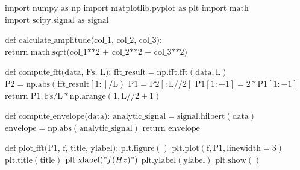 \begin{algorithmic}[1]
	\STATE $\text{import numpy as np}$
	\STATE $\text{import matplotlib.pyplot as plt}$
	\STATE $\text{import math}$
	\STATE $\text{import scipy.signal as signal}$
	
	\STATE
	\STATE $\text{def calculate\_amplitude(col\_1, col\_2, col\_3):}$
	\STATE \hspace{0.5cm} $\text{return math.sqrt(col\_1**2 + col\_2**2 + col\_3**2)}$
	
	\STATE
	\STATE $\text{def compute\_fft(data, Fs, L):}$
	\STATE \hspace{0.5cm} $\text{fft\_result} = \text{np.fft.fft}(\text{data}, \text{L})$
	\STATE \hspace{0.5cm} $\text{P2} = \text{np.abs}(\text{fft\_result}[1:] / \text{L})$
	\STATE \hspace{0.5cm} $\text{P1} = \text{P2}[: \text{L} // 2]$
	\STATE \hspace{0.5cm} $\text{P1}[1:-1] = 2 * \text{P1}[1:-1]$
	\STATE \hspace{0.5cm} $\text{return P1}, \text{Fs} / \text{L} * \text{np.arange}(1, \text{L} // 2 + 1)$
	
	\STATE
	\STATE $\text{def compute\_envelope(data):}$
	\STATE \hspace{0.5cm} $\text{analytic\_signal} = \text{signal.hilbert}(\text{data})$
	\STATE \hspace{0.5cm} $\text{envelope} = \text{np.abs}(\text{analytic\_signal})$
	\STATE \hspace{0.5cm} $\text{return envelope}$
	
	\STATE
	\STATE $\text{def plot\_fft(P1, f, title, ylabel):}$
	\STATE \hspace{0.5cm} $\text{plt.figure}()$
	\STATE \hspace{0.5cm} $\text{plt.plot}(\text{f}, \text{P1}, \text{linewidth} = 3)$
	\STATE \hspace{0.5cm} $\text{plt.title}(\text{title})$
	\STATE \hspace{0.5cm} $\text{plt.xlabel}("f (Hz)")$
	\STATE \hspace{0.5cm} $\text{plt.ylabel}(\text{ylabel})$
	\STATE \hspace{0.5cm} $\text{plt.show}()$
	

\end{algorithmic}
